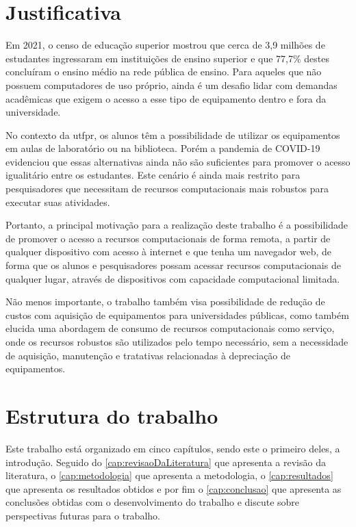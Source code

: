 \section{Justificativa}
\label{sec:justificativa}

Em 2021, o censo de educação superior mostrou que cerca de 3,9 milhões de estudantes ingressaram em
instituições de ensino superior e que 77,7\% destes concluíram o ensino médio na rede pública de
ensino. \citep{inep2021}
Para aqueles que não possuem computadores de uso próprio, ainda é um desafio lidar com demandas
acadêmicas que exigem o acesso a esse tipo de equipamento dentro e fora da universidade.

No contexto da \gls{utfpr}, os alunos têm a possibilidade de utilizar os equipamentos em aulas de
laboratório ou na biblioteca. Porém a pandemia de COVID-19 evidenciou que essas alternativas ainda
não são suficientes para promover o acesso igualitário entre os estudantes. Este cenário é ainda mais
restrito para pesquisadores que necessitam de recursos computacionais mais robustos para executar
suas atividades.

Portanto, a principal motivação para a realização deste trabalho é a possibilidade de promover o
acesso a recursos computacionais de forma remota, a partir de qualquer dispositivo com acesso à
internet e que tenha um navegador web, de forma que os alunos e pesquisadores possam acessar
recursos computacionais de qualquer lugar, através de dispositivos com capacidade computacional
limitada.

Não menos importante, o trabalho também visa possibilidade de redução de custos com aquisição de equipamentos para universidades públicas, como também elucida uma abordagem de consumo de recursos computacionais como serviço, onde os  recursos robustos são utilizados pelo tempo necessário, sem a necessidade de aquisição, manutenção e tratativas relacionadas à depreciação de equipamentos.

\section{Estrutura do trabalho}
\label{sec:estruturaTrabalho}

Este trabalho está organizado em cinco capítulos, sendo este o primeiro deles, a introdução. Seguido do \autoref{cap:revisaoDaLiteratura} que apresenta a revisão da literatura, o \autoref{cap:metodologia} que apresenta a metodologia, o \autoref{cap:resultados} que apresenta os resultados obtidos e por fim o \autoref{cap:conclusao} que apresenta as conclusões obtidas com o desenvolvimento do trabalho e discute sobre perspectivas futuras para o trabalho.


